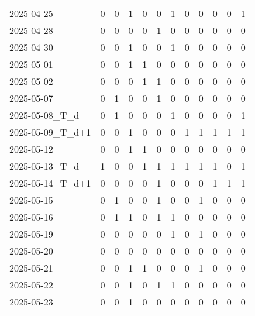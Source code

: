 \documentclass[dvipdfmx,oneside]{article}
\begin{document}
\begin{tabular}{lccccccccccc}
        2025-04-25 &     0 &     0 &     1 &     0 &     0 &     1 &     0 &     0 &     0 &     0 &     1 \\
        2025-04-28 &     0 &     0 &     0 &     0 &     1 &     0 &     0 &     0 &     0 &     0 &     0 \\
        2025-04-30 &     0 &     0 &     1 &     0 &     0 &     1 &     0 &     0 &     0 &     0 &     0 \\
        2025-05-01 &     0 &     0 &     1 &     1 &     0 &     0 &     0 &     0 &     0 &     0 &     0 \\
        2025-05-02 &     0 &     0 &     0 &     1 &     1 &     0 &     0 &     0 &     0 &     0 &     0 \\
        2025-05-07 &     0 &     1 &     0 &     0 &     1 &     0 &     0 &     0 &     0 &     0 &     0 \\
  2025-05-08\_T\_d &     0 &     1 &     0 &     0 &     0 &     1 &     0 &     0 &     0 &     0 &     1 \\
2025-05-09\_T\_d+1 &     0 &     0 &     1 &     0 &     0 &     0 &     1 &     1 &     1 &     1 &     1 \\
        2025-05-12 &     0 &     0 &     1 &     1 &     0 &     0 &     0 &     0 &     0 &     0 &     0 \\
  2025-05-13\_T\_d &     1 &     0 &     0 &     1 &     1 &     1 &     1 &     1 &     1 &     0 &     1 \\
2025-05-14\_T\_d+1 &     0 &     0 &     0 &     0 &     1 &     0 &     0 &     0 &     1 &     1 &     1 \\
        2025-05-15 &     0 &     1 &     0 &     0 &     1 &     0 &     0 &     1 &     0 &     0 &     0 \\
        2025-05-16 &     0 &     1 &     1 &     0 &     1 &     1 &     0 &     0 &     0 &     0 &     0 \\
        2025-05-19 &     0 &     0 &     0 &     0 &     0 &     1 &     0 &     1 &     0 &     0 &     0 \\
        2025-05-20 &     0 &     0 &     0 &     0 &     0 &     0 &     0 &     0 &     0 &     0 &     0 \\
        2025-05-21 &     0 &     0 &     1 &     1 &     0 &     0 &     0 &     1 &     0 &     0 &     0 \\
        2025-05-22 &     0 &     0 &     1 &     0 &     1 &     1 &     0 &     0 &     0 &     0 &     0 \\
        2025-05-23 &     0 &     0 &     1 &     0 &     0 &     0 &     0 &     0 &     0 &     0 &     0 \\

\end{tabular}
\end{document}

